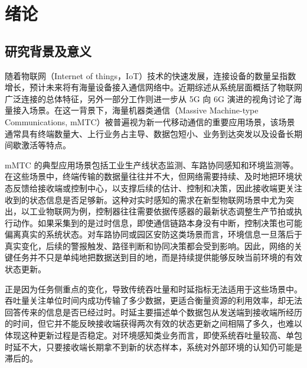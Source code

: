 \clearpage

\vspace*{-1\baselineskip}
\section{绪论}
\vspace{6pt}

\subsection{研究背景及意义}

随着物联网（Internet of things，IoT）技术的快速发展，连接设备的数量呈指数增长，预计未来将有海量设备接入通信网络中。近期综述从系统层面概括了物联网广泛连接的总体特征，另外一部分工作则进一步从 5G 向 6G 演进的视角讨论了海量接入场景。在这一背景下，海量机器类通信（Massive Machine-type Communications, mMTC）被普遍视为新一代移动通信的重要应用场景，该场景通常具有终端数量大、上行业务占主导、数据包短小、业务到达突发以及设备长期间歇激活等特点。

mMTC 的典型应用场景包括工业生产线状态监测、车路协同感知和环境监测等。在这些场景中，终端传输的数据量往往并不大，但网络需要持续、及时地把环境状态反馈给接收端或控制中心，以支撑后续的估计、控制和决策，因此接收端更关注收到的状态信息是否足够新。这种对实时感知的需求在新型物联网场景中尤为突出，以工业物联网为例，控制器往往需要依据传感器的最新状态调整生产节拍或执行动作。如果采集到的是过时信息，即使通信链路本身没有中断，控制决策也可能偏离真实的系统状态。对车路协同或园区安防这类场景而言，环境信息一旦落后于真实变化，后续的警报触发、路径判断和协同决策都会受到影响。因此，网络的关键任务并不只是单纯地把数据送到目的地，而是持续提供能够反映当前环境的有效状态更新。

正是因为任务侧重点的变化，导致传统吞吐量和时延指标无法适用于这些场景中。吞吐量关注单位时间内成功传输了多少数据，更适合衡量资源的利用效率，却无法回答传来的信息是否已经过时。时延主要描述单个数据包从发送端到接收端所经历的时间，但它并不能反映接收端获得两次有效的状态更新之间相隔了多久，也难以体现这种更新过程是否稳定。对环境感知类业务而言，即使系统吞吐量较高、单包时延不大，只要接收端长期拿不到新的状态样本，系统对外部环境的认知仍可能是滞后的。

